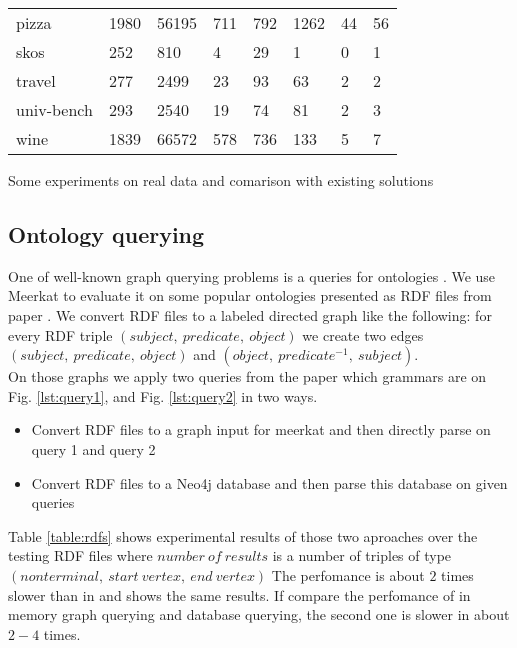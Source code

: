 \begin{table*}[t]
\begin{tabular}{|l|l|lll|lll|}
pizza                       & 1980 & 56195 & 711 & 792 & 1262 & 44 & 56 \\
skos                        & 252  & 810   & 4   & 29  & 1    & 0  & 1  \\
travel                      & 277  & 2499  & 23  & 93  & 63   & 2  & 2  \\
univ-bench                  & 293  & 2540  & 19  & 74  & 81   & 2  & 3  \\
wine                        & 1839 & 66572 & 578 & 736 & 133  & 5  & 7  \\
\hline
\end{tabular}
\caption{Evaluation results for In Memory Graph and Graph DB}
\label{table:rdfs}
\end{table*}

Some experiments on real data and comarison with existing solutions

\subsection{Ontology querying}

One of well-known graph querying problems is a queries for ontologies \cite{FndDB}. We use Meerkat to evaluate
it on some popular ontologies presented as RDF files from paper \cite{CFGonRDF}. We convert RDF files to a labeled directed graph like the following: for every RDF triple $(subject,\ predicate,\ object)$ we create two edges $(subject,\ predicate,\ object)$ and $(object,\ predicate^{-1},\ subject)$.\\
On those graphs we apply two queries from the paper \cite{GrigorevR16} which grammars are on Fig. \ref{lst:query1}, and Fig. \ref{lst:query2} in two ways.
\begin{itemize}
	\item Convert RDF files to a graph input for meerkat and then directly parse on query 1 and query 2
	\item Convert RDF files to a Neo4j database and then parse this database on given queries
\end{itemize} 
Table \ref{table:rdfs} shows experimental results of those two aproaches over the testing RDF files where $number\ of\ results$ is a number of triples of type $(nonterminal,\ start\ vertex,\ end\ vertex)$
The perfomance is about $2$ times slower than in \cite{GrigorevR16} and shows the same results. If compare the perfomance of in memory graph querying and database querying, the second one is slower in about $2-4$ times.



